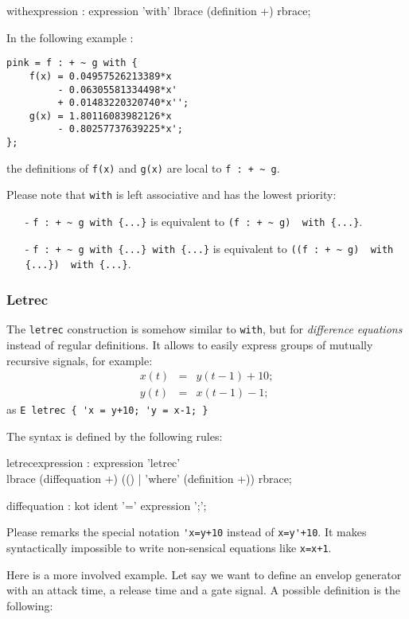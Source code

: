 \begin{rail}
withexpression : expression 'with' lbrace (definition +) rbrace;
\end{rail}


In the following example :
\begin{lstlisting}
pink = f : + ~ g with {
	f(x) = 0.04957526213389*x 
		 - 0.06305581334498*x' 
         + 0.01483220320740*x'';
	g(x) = 1.80116083982126*x 
		 - 0.80257737639225*x';
};
\end{lstlisting}
the definitions of \lstinline'f(x)' and \lstinline'g(x)' are local to \lstinline'f : + ~ g'.

Please note that \lstinline'with' is left associative and has the lowest priority:
\begin{itemize} 
\item[-] \lstinline'f : + ~ g with {...}' is equivalent to \lstinline'(f : + ~ g)  with {...}'. 
\item[-] \lstinline'f : + ~ g with {...} with {...}' is equivalent to \lstinline'((f : + ~ g)  with {...})  with {...}'. 
\end{itemize}

\subsubsection{Letrec} 
The \lstinline'letrec' construction is somehow similar to \lstinline'with', but for   \emph{difference equations} instead of regular definitions. It allows to easily express groups of mutually recursive signals, for example:
\begin{eqnarray*}
x(t)&=&y(t-1)+10;\\
y(t)&=&x(t-1)-1;
\end{eqnarray*}
as \lstinline|E letrec { 'x = y+10; 'y = x-1; }|	

The syntax is defined by the following rules:
\begin{rail}
	letrecexpression : expression 'letrec' \\ lbrace (diffequation +) (() | 'where' (definition +)) rbrace;
\end{rail}
\begin{rail}
	diffequation :    kot ident '=' expression ';';  
\end{rail}

Please remarks the special notation \lstinline|'x=y+10| instead of \lstinline|x=y'+10|. It makes syntactically impossible to write non-sensical equations like \lstinline|x=x+1|.

Here is a more involved example. Let say we want to define an envelop generator with an attack time, a release time and a gate signal. A possible definition is the following:

